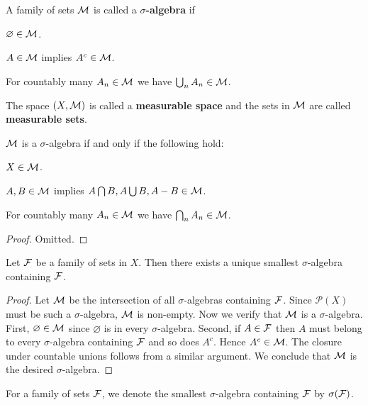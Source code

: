 \begin{definition}
    A family of sets $\mathcal{M}$ is called a \textbf{$\sigma$-algebra} if 
    \begin{thmenum}
        \item $\varnothing\in\mathcal{M}$.
        \item $A\in\mathcal{M}$ implies $A^c\in\mathcal{M}$.
        \item For countably many $A_n\in\mathcal{M}$ we have $\bigcup_n A_n\in\mathcal{M}$.
    \end{thmenum}
    The space $(X,\mathcal{M})$ is called a \textbf{measurable space} and 
    the sets in $\mathcal{M}$ are called \textbf{measurable sets}.
\end{definition} 

\begin{proposition}
    $\mathcal{M}$ is a $\sigma$-algebra if and only if the following hold: 
    \begin{thmenum}
        \item $X\in\mathcal{M}$.
        \item $A,B\in\mathcal{M}$ implies $A\bigcap B, A\bigcup B, A-B\in\mathcal{M}$.
        \item For countably many $A_n\in\mathcal{M}$ we have $\bigcap_n A_n\in\mathcal{M}$.
    \end{thmenum}
\end{proposition}
\begin{proof}
    Omitted.
\end{proof}

\begin{proposition}
    Let $\mathcal{F}$ be a family of sets in $X$. Then there exists a unique 
    smallest $\sigma$-algebra containing $\mathcal{F}$.
\end{proposition}
\begin{proof}
    Let $\mathcal{M}$ be the intersection of all $\sigma$-algebras containing 
    $\mathcal{F}$. Since $\mathcal{P}(X)$ must be such a $\sigma$-algebra, 
    $\mathcal{M}$ is non-empty. Now we verify that $\mathcal{M}$ is a $\sigma$-algebra. 
    First, $\varnothing\in\mathcal{M}$ since $\varnothing$ is in every 
    $\sigma$-algebra. Second, if $A\in\mathcal{F}$ then $A$ must belong to 
    every $\sigma$-algebra containing $\mathcal{F}$ and so does $A^c$. Hence 
    $A^c\in\mathcal{M}$. The closure under countable unions follows from 
    a similar argument. We conclude that $\mathcal{M}$ is the desired 
    $\sigma$-algebra.
\end{proof}

\begin{definition}
    For a family of sets $\mathcal{F}$, we denote the smallest $\sigma$-algebra 
    containing $\mathcal{F}$ by $\sigma(\mathcal{F})$.
\end{definition}

